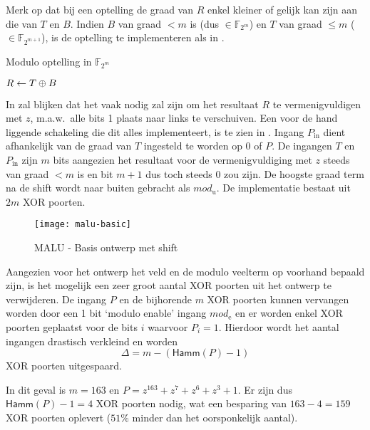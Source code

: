 Merk op dat bij een optelling de graad van $R$ enkel kleiner of gelijk kan zijn aan die van $T$ en $B$. Indien $B$ van graad $< m$ is (dus $\in \mathbb{F}_{2^m}$) en $T$ van graad $\leq m$ ($\in \mathbb{F}_{2^{m+1}}$), is de optelling te implementeren als in .

\begin{algorithm}[h]
	\caption{Modulo optelling in $\mathbb{F}_{2^m}$}
	\label{algoritme-implementatie-malu-modulo}

	$R \leftarrow T \oplus B$\;

\end{algorithm}

In  zal blijken dat het vaak nodig zal zijn om het resultaat $R$ te vermenigvuldigen met $z$, m.a.w.\ alle bits 1 plaats naar links te verschuiven. Een voor de hand liggende schakeling die dit alles implementeert, is te zien in . Ingang $P_{\text{in}}$ dient afhankelijk van de graad van $T$ ingesteld te worden op $0$ of $P$. De ingangen $T$ en $P_{\text{in}}$ zijn $m$ bits aangezien het resultaat voor de vermenigvuldiging met $z$ steeds van graad $< m$ is en bit $m + 1$ dus toch steeds 0 zou zijn. De hoogste graad term na de shift wordt naar buiten gebracht als $mod_{\text{u}}$. De implementatie bestaat uit $2m$ XOR poorten.

\begin{figure}[h]
	\centering
		\texttt{[image: malu-basic]}
		\caption{MALU - Basis ontwerp met shift\label{figuur-implementatie-malu-basic}}
\end{figure}

Aangezien voor het ontwerp het veld en de modulo veelterm op voorhand bepaald zijn, is het mogelijk een zeer groot aantal XOR poorten uit het ontwerp te verwijderen. De ingang $P$ en de bijhorende $m$ XOR poorten kunnen vervangen worden door een 1 bit `modulo enable' ingang $mod_{\text{e}}$ en er worden enkel XOR poorten geplaatst voor de bits $i$ waarvoor $P_i = 1$. Hierdoor wordt het aantal ingangen drastisch verkleind en worden 
\[\Delta = m - (\textsf{Hamm}(P) - 1)\]
XOR poorten uitgespaard.

In dit geval is $m = 163$ en $P = z^{163} + z^7 + z^6 + z^3 + 1$. Er zijn dus $\textsf{Hamm}(P) - 1 = 4$ XOR poorten nodig, wat een besparing van $163 - 4 =  159$ XOR poorten oplevert ($51\%$ minder dan het oorsponkelijk aantal).

